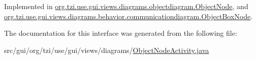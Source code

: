 Implemented in \hyperlink{classorg_1_1tzi_1_1use_1_1gui_1_1views_1_1diagrams_1_1objectdiagram_1_1_object_node_a9c2042a6de242750d94a3a9695567470}{org.\-tzi.\-use.\-gui.\-views.\-diagrams.\-objectdiagram.\-Object\-Node}, and \hyperlink{classorg_1_1tzi_1_1use_1_1gui_1_1views_1_1diagrams_1_1behavior_1_1communicationdiagram_1_1_object_box_node_a51bf6c34e9961d73f2ef37aeb78bdfd7}{org.\-tzi.\-use.\-gui.\-views.\-diagrams.\-behavior.\-communicationdiagram.\-Object\-Box\-Node}.



The documentation for this interface was generated from the following file\-:\begin{DoxyCompactItemize}
\item 
src/gui/org/tzi/use/gui/views/diagrams/\hyperlink{_object_node_activity_8java}{Object\-Node\-Activity.\-java}\end{DoxyCompactItemize}
